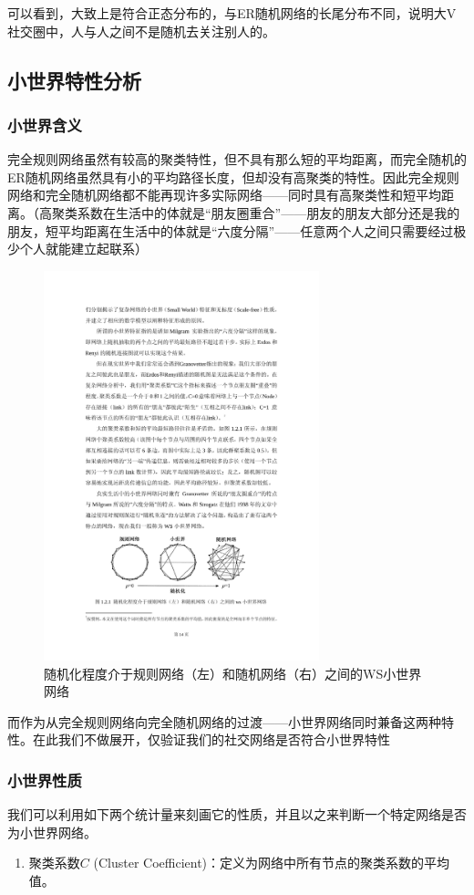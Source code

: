 \documentclass[a4paper]{article}
\begin{document}
\begin{spacing}{1.5}
可以看到，大致上是符合正态分布的，与ER随机网络的长尾分布不同，说明大V社交圈中，人与人之间不是随机去关注别人的。


\subsection{小世界特性分析}
\subsubsection{小世界含义}
完全规则网络虽然有较高的聚类特性，但不具有那么短的平均距离，而完全随机的ER随机网络虽然具有小的平均路径长度，但却没有高聚类的特性。因此完全规则网络和完全随机网络都不能再现许多实际网络——同时具有高聚类性和短平均距离。（高聚类系数在生活中的体就是“朋友圈重合”——朋友的朋友大部分还是我的朋友，短平均距离在生活中的体就是“六度分隔”——任意两个人之间只需要经过极少个人就能建立起联系）
\begin{figure}[H]
  \centering
  \includegraphics[width=8cm]{fig/f6.pdf}
  \caption{随机化程度介于规则网络（左）和随机网络（右）之间的WS小世界网络}\label{ws}
\end{figure}

而作为从完全规则网络向完全随机网络的过渡——小世界网络同时兼备这两种特性。在此我们不做展开，仅验证我们的社交网络是否符合小世界特性
\subsubsection{小世界性质}
我们可以利用如下两个统计量来刻画它的性质，并且以之来判断一个特定网络是否为小世界网络。
\begin{enumerate}
\item
聚类系数$C$ (Cluster Coefficient)：定义为网络中所有节点的聚类系数的平均值。


\end{enumerate}
\end{spacing}
\end{document}
